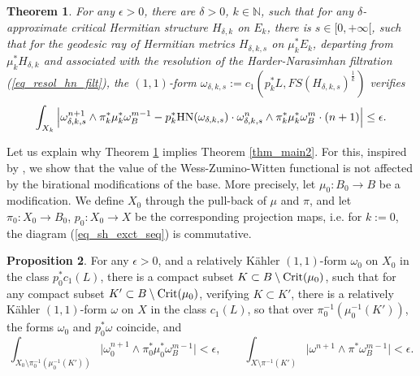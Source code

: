 \documentclass[12pt]{article}
\numberwithin{equation}{section}
\theoremstyle{theorem}
\newtheorem{thm}{Theorem}[section]
\theoremstyle{definition}
\newtheorem{prop}[thm]{Proposition}
\theoremstyle{remark}
\newcommand{\nat}{\mathbb{N}}
\begin{document}
	\begin{thm}\label{thm_expl_const1}
		For any $\epsilon > 0$, there are $\delta > 0$, $k \in \nat$, such that for any $\delta$-approximate critical Hermitian structure $H_{\delta, k}$ on $E_k$, there is $s \in [0, + \infty[$, such that for the geodesic ray of Hermitian metrics $H_{\delta, k, s}$ on $\mu_k^* E_k$, departing from $\mu_k^* H_{\delta, k}$ and associated with the resolution of the Harder-Narasimhan filtration (\ref{eq_resol_hn_filt}), the $(1, 1)$-form $\omega_{\delta, k, s} := c_1(p_k^* L, FS(H_{\delta, k, s})^{\frac{1}{k}})$ verifies
		\begin{equation}\label{eq_expl_const1}
			\int_{X_k}
			\Big|
			\omega_{\delta, k, s}^{n + 1} \wedge \pi_k^* \mu_k^* \omega_B^{m - 1}
			-
			p_k^* {\rm{HN}}(\omega_{\delta, k, s}) \cdot \omega_{\delta, k, s}^n \wedge  \pi_k^* \mu_k^* \omega_B^m \cdot (n + 1)
			\Big|
			\leq
			\epsilon.
		\end{equation}
	\end{thm}
	\par 
	Let us explain why Theorem \ref{thm_expl_const1} implies Theorem \ref{thm_main2}.
	For this, inspired by \cite[Proposition 2.1]{DemAndrGrau}, we show that the value of the Wess-Zumino-Witten functional is not affected by the birational modifications of the base. 
	More precisely, let $\mu_0 : B_0 \to B$ be a modification. 
	We define $X_0$ through the pull-back of $\mu$ and $\pi$, and let $\pi_0 : X_0 \to B_0$, $p_0 : X_0 \to X$ be the corresponding projection maps, i.e. for $k := 0$, the diagram (\ref{eq_sh_exct_seq}) is commutative.
	\begin{prop}\label{prop_bir_mod}
		For any $\epsilon > 0$, and a relatively Kähler $(1, 1)$-form $\omega_0$ on $X_0$ in the class $p_0^* c_1(L)$, there is a compact subset $K \subset B \setminus {\rm{Crit}}(\mu_0)$, such that for any compact subset $K' \subset B \setminus {\rm{Crit}}(\mu_0)$, verifying $K \subset K'$, there is a relatively Kähler $(1, 1)$-form $\omega$ on $X$ in the class $c_1(L)$, so that over $\pi_0^{-1}(\mu_0^{-1}(K'))$, the forms $\omega_0$ and $p_0^* \omega$ coincide, and 
		\begin{equation}\label{eq_prop_bir_mod}
			\int_{X_0 \setminus \pi_0^{-1}(\mu_0^{-1}(K'))} \big| \omega_0^{n + 1} \wedge \pi_0^* \mu_0^* \omega_B^{m - 1} \big| < \epsilon, 
			\qquad 
			\int_{X \setminus \pi^{-1}(K')} \big| \omega^{n + 1} \wedge \pi^* \omega_B^{m - 1} \big| < \epsilon.
		\end{equation}
	\end{prop}
\end{document}
